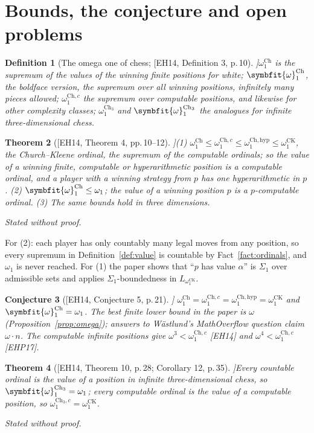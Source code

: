 \documentclass[10pt]{article}
\theoremstyle{notes}
\newtheorem{theorem}{Theorem}[section]
\newtheorem{conjecture}[theorem]{Conjecture}
\newtheorem{definition}[theorem]{Definition}
\newcommand{\stated}{\par\noindent\emph{Stated without proof.}\par}
\newcommand{\EH}[1]{[EH14, #1]}
\newcommand{\bomega}{\symbfit{\omega}}
\newcommand{\Ch}{\mathrm{Ch}}
\newcommand{\CK}{\mathrm{CK}}
\begin{document}
\section{Bounds, the conjecture and open problems}

\begin{definition}[The omega one of chess; \EH{Definition 3, p.\,10}]\label{def:omegaone}
$\omega_1^{\Ch}$ is the supremum of the values of the winning finite positions for white;
$\bomega_1^{\Ch}$, the boldface version, the supremum over all winning positions, infinitely many pieces
allowed;
$\omega_1^{\Ch,c}$ the supremum over computable positions, and likewise for other complexity classes;
$\omega_1^{\Ch_3}$ and $\bomega_1^{\Ch_3}$ the analogues for infinite three-dimensional chess.
\end{definition}

\begin{theorem}[\EH{Theorem 4, pp.\,10--12}]\label{thm:bounds}
(1) $\omega_1^{\Ch}\le\omega_1^{\Ch,c}\le\omega_1^{\Ch,\mathrm{hyp}}\le\omega_1^{\CK}$, the Church--Kleene
ordinal, the supremum of the computable ordinals; so the value of a winning finite, computable or
hyperarithmetic position is a computable ordinal, and a player with a winning strategy from $p$ has one
hyperarithmetic in $p$. (2) $\bomega_1^{\Ch}\le\omega_1$; the value of a winning position $p$ is a
$p$-computable ordinal. (3) The same bounds hold in three dimensions.
\stated
\end{theorem}

For (2): each player has only countably many legal moves from any position, so every supremum in
Definition~\ref{def:value} is countable by Fact~\ref{fact:ordinals}, and $\omega_1$ is never reached. For
(1) the paper shows that ``$p$ has value $\alpha$'' is $\Sigma_1$ over admissible sets and applies
$\Sigma_1$-boundedness in $L_{\omega_1^{\CK}}$.

\begin{conjecture}[\EH{Conjecture 5, p.\,21}]
$\omega_1^{\Ch}=\omega_1^{\Ch,c}=\omega_1^{\Ch,\mathrm{hyp}}=\omega_1^{\CK}$ and $\bomega_1^{\Ch}=\omega_1$.
The best finite lower bound in the paper is $\omega$ (Proposition~\ref{prop:omega}); answers to Wästlund's
MathOverflow question claim $\omega\cdot n$. The computable infinite positions give
$\omega^3<\omega_1^{\Ch,c}$ [EH14] and $\omega^4<\omega_1^{\Ch,c}$ [EHP17].
\end{conjecture}

\begin{theorem}[\EH{Theorem 10, p.\,28; Corollary 12, p.\,35}]\label{thm:threed}
Every countable ordinal is the value of a position in infinite three-dimensional chess, so
$\bomega_1^{\Ch_3}=\omega_1$; every computable ordinal is the value of a computable position, so
$\omega_1^{\Ch_3,c}=\omega_1^{\CK}$.
\stated
\end{theorem}
\end{document}
